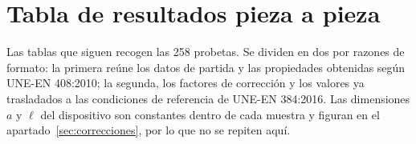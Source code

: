 \documentclass[11pt,a4paper]{article}
\begin{document}
\section{Tabla de resultados pieza a pieza}
\label{anx:piezas}

Las tablas que siguen recogen las \num{258} probetas. Se dividen en dos por razones de
formato: la primera reúne los datos de partida y las propiedades obtenidas según
UNE-EN 408:2010; la segunda, los factores de corrección y los valores ya trasladados a
las condiciones de referencia de UNE-EN 384:2016. Las dimensiones $a$ y $\ell$ del
dispositivo son constantes dentro de cada muestra y figuran en el
apartado~\ref{sec:correcciones}, por lo que no se repiten aquí.
\end{document}

